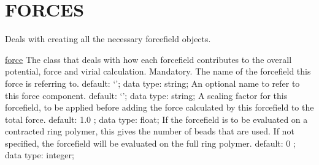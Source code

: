 \section{FORCES}
\label{FORCES}
\begin{ipifield}{}%
{Deals with creating all the necessary forcefield objects.}%
{}%
{}
\begin{ipifield}{\hyperref[FORCECOMPONENT]{force}}%
{The class that deals with how each forcefield contributes to the overall potential, force and virial calculation.}%
{}%
{%
{Mandatory. The name of the forcefield this force is referring to.}%
{default: `'; data type: string; }%
%
{An optional name to refer to this force component.}%
{default: `'; data type: string; }%
%
{A scaling factor for this forcefield, to be applied before adding the force calculated by this forcefield to the total force.}%
{default:  1.0 ; data type: float; }%
%
{If the forcefield is to be evaluated on a contracted ring polymer, this gives the number of beads that are used. If not specified, the forcefield will be evaluated on the full ring polymer.}%
{default:  0 ; data type: integer; }%
}
\end{ipifield}
\end{ipifield}
